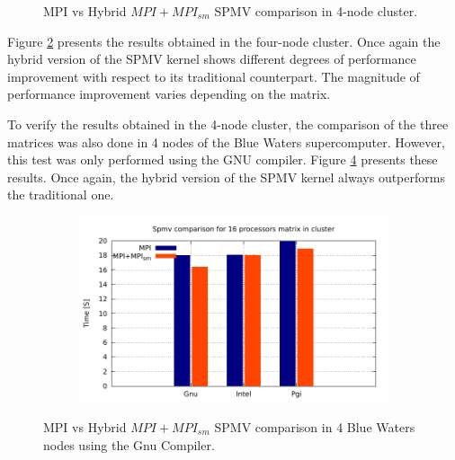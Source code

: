 \begin{figure} [h!]
\begin{subfigure}{.6\textwidth}
      \label{fig:HybridDunkel}
    \end{subfigure}
\caption{MPI vs Hybrid $MPI+MPI_{sm}$ SPMV comparison in 4-node cluster.}
\label{fig:spmvCluster4}
\end{figure}


\medskip

Figure \ref{fig:spmvCluster4} presents the results obtained in the four-node cluster. Once again the hybrid version of the SPMV kernel shows different degrees of performance improvement with respect to its traditional counterpart. The magnitude of performance improvement varies depending on the matrix.

\medskip

To verify the results obtained in the 4-node cluster, the comparison of the three matrices was also done in 4 nodes of the Blue Waters supercomputer. However, this test was only performed using the GNU compiler. Figure \ref{fig:spmvClusteBW} presents these results. Once again, the hybrid version of the SPMV kernel always outperforms the traditional one.

\medskip


\begin{figure} [h!]
    \centering
    \captionsetup{justification=centering, singlelinecheck=false}
    \begin{subfigure}{.6\textwidth}
      \centering
      \hspace*{-1.5cm} 
      \includegraphics[page=4, width=0.95\linewidth]{Plots/HybridProgramming/spmvCluster.pdf}
      \label{fig:HybridPorter}
    \end{subfigure}%
\caption{MPI vs Hybrid $MPI+MPI_{sm}$ SPMV comparison in 4 Blue Waters nodes using the Gnu Compiler.}
\label{fig:spmvClusteBW}
\end{figure}




